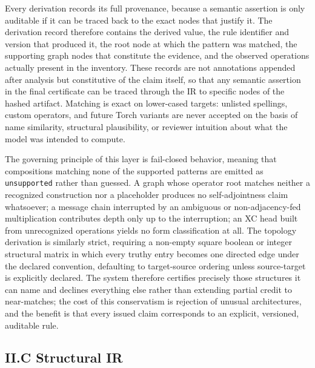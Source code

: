 Every derivation records its full provenance, because a semantic assertion is only auditable if it can be traced back to the exact nodes that justify it. The derivation record therefore contains the derived value, the rule identifier and version that produced it, the root node at which the pattern was matched, the supporting graph nodes that constitute the evidence, and the observed operations actually present in the inventory. These records are not annotations appended after analysis but constitutive of the claim itself, so that any semantic assertion in the final certificate can be traced through the IR to specific nodes of the hashed artifact. Matching is exact on lower-cased targets: unlisted spellings, custom operators, and future Torch variants are never accepted on the basis of name similarity, structural plausibility, or reviewer intuition about what the model was intended to compute.

The governing principle of this layer is fail-closed behavior, meaning that compositions matching none of the supported patterns are emitted as \texttt{unsupported} rather than guessed. A graph whose operator root matches neither a recognized construction nor a placeholder produces no self-adjointness claim whatsoever; a message chain interrupted by an ambiguous or non-adjacency-fed multiplication contributes depth only up to the interruption; an XC head built from unrecognized operations yields no form classification at all. The topology derivation is similarly strict, requiring a non-empty square boolean or integer structural matrix in which every truthy entry becomes one directed edge under the declared convention, defaulting to target-source ordering unless source-target is explicitly declared. The system therefore certifies precisely those structures it can name and declines everything else rather than extending partial credit to near-matches; the cost of this conservatism is rejection of unusual architectures, and the benefit is that every issued claim corresponds to an explicit, versioned, auditable rule.

\subsection*{II.C Structural IR}

